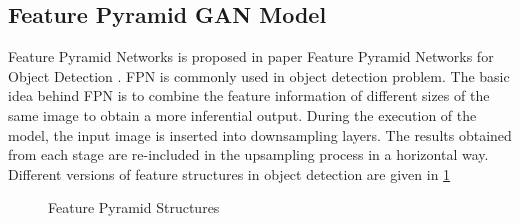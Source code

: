 \subsection{Feature Pyramid GAN Model}
Feature Pyramid Networks is proposed in paper Feature Pyramid Networks for Object Detection \cite{feature_pyramid}. FPN is commonly used in object detection problem. The basic idea behind FPN is to combine the feature information of different sizes of the same image to obtain a more inferential output. During the execution of the model, the input image is inserted into downsampling layers. The results obtained from each stage are re-included in the upsampling process in a horizontal way. Different versions of feature structures in object detection are given in \ref{fig:fpnstructs}

\begin{figure}[!ht]
    \centering
        \hspace{0.05\columnwidth}
        \hspace{0.05\columnwidth}
        \hspace{0.05\columnwidth}
        \vspace*{3mm}
        \caption{Feature Pyramid Structures \cite{feature_pyramid}}
    \label{fig:fpnstructs}
\end{figure}

